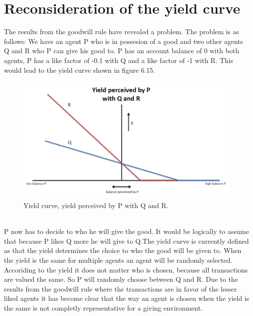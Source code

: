 \documentclass[twoside,openright]{uva-bachelor-thesis}
\begin{document}
\section{Reconsideration of the yield curve}
The results from the goodwill rule have revealed a problem. The problem is as follows: We have an agent P who is in possesion of a good and two other agents Q and R who P can give his good to. P has an account balance of 0 with both agents, P has a like factor of -0.1 with Q and a like factor of -1 with R. This would lead to the yield curve shown in figure 6.15. \\
\begin{figure}[h!]
    \centering
    \includegraphics[scale=0.4]{YieldCurves/yieldcurve_P_QR}
\caption{Yield curve, yield perceived by P with Q and R.}
\end{figure}
\\
P now has to decide to who he will give the good. It would be logically to assume that because P likes Q more he will give to Q.The yield curve is currently defined as that the yield determines the choice to who the good will be given to. When the yield is the same for multiple agents an agent will be randomly selected. Accoriding to the yield it does not matter who is chosen, because all transactions are valued the same. So P will randomly choose between Q and R. Due to the results from the goodwill rule where the transactions are in favor of the lesser liked agents it has become clear that the way an agent is chosen when the yield is the same is not completly representative for a giving environment.
\end{document}
